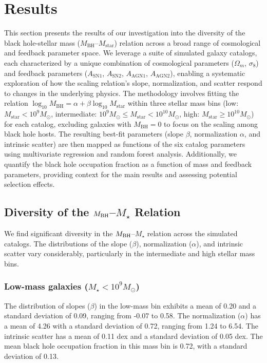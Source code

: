 \documentclass[twocolumn]{aastex631}
\begin{document}
\section{Results}
\label{sec:results}
This section presents the results of our investigation into the diversity of the black hole-stellar mass ($M_\mathrm{BH}$--$M_\mathrm{star}$) relation across a broad range of cosmological and feedback parameter space. We leverage a suite of simulated galaxy catalogs, each characterized by a unique combination of cosmological parameters ($\Omega_m$, $\sigma_8$) and feedback parameters ($A_\mathrm{SN1}$, $A_\mathrm{SN2}$, $A_\mathrm{AGN1}$, $A_\mathrm{AGN2}$), enabling a systematic exploration of how the scaling relation's slope, normalization, and scatter respond to changes in the underlying physics. The methodology involves fitting the relation $\log_{10} M_\mathrm{BH} = \alpha + \beta \log_{10} M_\mathrm{star}$ within three stellar mass bins (low: $M_\mathrm{star} < 10^9 M_{\odot}$, intermediate: $10^9 M_{\odot} \leq M_\mathrm{star} < 10^{10} M_{\odot}$, high: $M_\mathrm{star} \geq 10^{10} M_{\odot}$) for each catalog, excluding galaxies with $M_\mathrm{BH} = 0$ to focus on the scaling among black hole hosts. The resulting best-fit parameters (slope $\beta$, normalization $\alpha$, and intrinsic scatter) are then mapped as functions of the six catalog parameters using multivariate regression and random forest analysis. Additionally, we quantify the black hole occupation fraction as a function of mass and feedback parameters, providing context for the main results and assessing potential selection effects.

\subsection{Diversity of the $M_{\rm BH}$--$M_{\star}$ Relation}

We find significant diversity in the $M_{\rm BH}$--$M_{\star}$ relation across the simulated catalogs. The distributions of the slope ($\beta$), normalization ($\alpha$), and intrinsic scatter vary considerably, particularly in the intermediate and high stellar mass bins.

\subsubsection{Low-mass galaxies ($M_{\star} < 10^9 M_{\odot}$)}

The distribution of slopes ($\beta$) in the low-mass bin exhibits a mean of 0.20 and a standard deviation of 0.09, ranging from -0.07 to 0.58. The normalization ($\alpha$) has a mean of 4.26 with a standard deviation of 0.72, ranging from 1.24 to 6.54. The intrinsic scatter has a mean of 0.11 dex and a standard deviation of 0.05 dex. The mean black hole occupation fraction in this mass bin is 0.72, with a standard deviation of 0.13.
\end{document}
